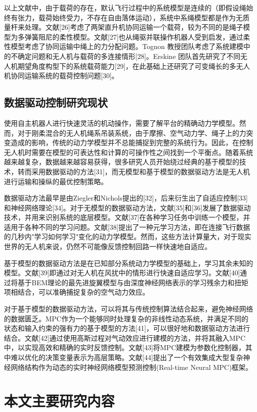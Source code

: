 \documentclass[lang=chs, degree=master, blindreview=false, winfonts=true]{yanputhesis}
\begin{document}
以上文献中，由于载荷的存在，默认飞行过程中的系统模型是连续的（即假设绳始终有张力，载荷始终受力，不存在自由落体运动），系统中系绳模型都是作为无质量杆来处理。文献[26]考虑了两架直升机协同运输一个载荷，较为不同的是绳子模型为多弹簧阻尼的柔性模型。文献[27]也从绳驱并联操作机器人受到启发，通过柔性模型考虑了协同运输中绳上的力分配问题。Tognon 教授团队考虑了系统建模中的不确定问题和无人机与载荷的多连接情形[28]。Erskine 团队首先研究了不同无人机期望角度构型下的系统载荷能力[29]，在此基础上还研究了可变绳长的多无人机协同运输系统的载荷控制问题[30]。


\subsection{数据驱动控制研究现状}
使用自主机器人进行快速灵活的机动操作，需要了解平台的精确动力学模型。然而，对于刚柔混合的无人机绳系吊装系统，由于摩擦、空气动力学、绳子上的力突变造成的影响，传统的动力学模型并不总能捕捉到完整的系统行为。因此，在控制无人机时需要在模型的可表达性和计算的可操作性之间找到一个平衡点。随着系统越来越复杂，数据越来越容易获得，很多研究人员开始绕过经典的基于模型的技术，转而采用数据驱动的方法[31]，而无模型和基于模型的数据驱动方法是无人机进行运输和操纵的最优控制策略。

数据驱动方法最早是由Ziegler和Nichols提出的[32]，后来衍生出了自适应控制[33]和神经网络理论[34]。对于无模型的数据驱动方法，文献[35]和[36]发展了数据驱动技术，并用来识别系统的底层模型。文献[37]在各种学习任务中训练一个模型，并适用于各种不同的学习问题。文献[38]提出了一种元学习方法，即在连接飞行数据的几秒内"学习如何学习"变化的动力学模型。然而，这些方法计算量大，对于现实世界的无人机来说，仍然不可能像反馈控制回路一样快速地自适应。

基于模型的数据驱动方法是在已知部分系统动力学模型的基础上，学习其余未知的模型。文献[39]即通过对无人机在风扰中的情形进行快速自适应学习。文献[40]通过将基于BEM理论的最先进旋翼模型与由深度神经网络表示的学习残余力和扭矩项相结合，可以准确捕捉复杂的空气动力效应。

对于基于模型的数据驱动方法，可以将其与传统控制算法结合起来，避免神经网络的数据匮乏。MPC作为一个能够同时处理复杂的非线性动态系统，并满足不同的状态和输入约束的强有力的基于模型的方法[41]，可以很好地和数据驱动方法进行结合。文献[42]通过使用高斯过程对气动效应进行建模的方法，并将其融入MPC中，以实现高效和精确的实时反馈控制。文献[43]将MPC建模为参数化控制器，其中难以优化的决策变量表示为高层策略。文献[44]提出了一个有效集成大型复杂神经网络结构作为动态的实时神经网络模型预测控制(Real-time Neural MPC)框架。

\section{本文主要研究内容}
\end{document}
